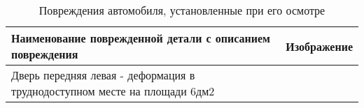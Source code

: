 
\begin{longtable}{|M{105mm}|M{50mm}|}
	\caption[]{\footnotesize {Повреждения автомобиля, установленные при его осмотре}} \label{tab:5}\\ 
	\hline
\bf {\small Наименование поврежденной детали с описанием повреждения} & \bf {\small Изображение} \\ \hline \endhead
{\small Дверь передняя левая -  деформация в труднодоступном месте на площади 6дм2}&  \\ \hline 

\end{longtable}


